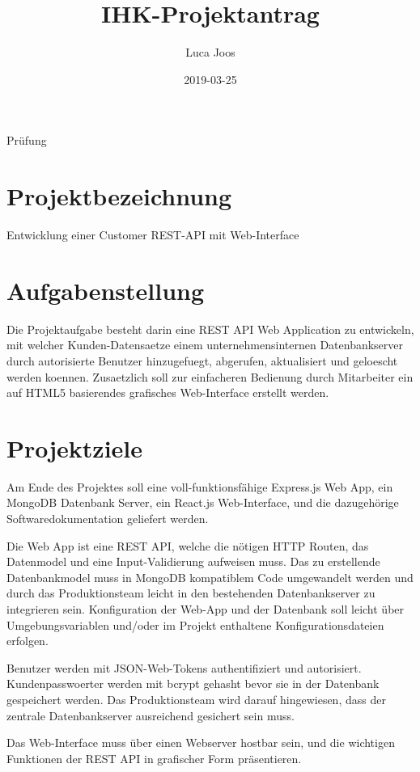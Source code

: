 \documentclass[11pt, a4paper]{article}
\title{IHK-Projektantrag}
\date{2019-03-25}
\author{Luca Joos}
\begin{document}
\maketitle
{}\newline
Pr{\"u}fung\quad {}\newline

\section{Projektbezeichnung}
Entwicklung einer Customer REST-API mit Web-Interface

\section{Aufgabenstellung}
Die Projektaufgabe besteht darin eine REST API Web Application zu entwickeln,
mit welcher Kunden-Datensaetze einem unternehmensinternen Datenbankserver durch
autorisierte Benutzer hinzugefuegt, abgerufen, aktualisiert und geloescht werden
koennen. Zusaetzlich soll zur einfacheren Bedienung durch Mitarbeiter ein auf
HTML5 basierendes grafisches Web-Interface erstellt werden.

\section{Projektziele}
Am Ende des Projektes soll eine voll-funktionsfähige Express.js Web App, ein
MongoDB Datenbank Server, ein React.js Web-Interface, und die dazugehörige
Softwaredokumentation geliefert werden.

Die Web App ist eine REST API, welche die nötigen HTTP Routen, das Datenmodel
und eine Input-Validierung aufweisen muss. Das zu erstellende Datenbankmodel
muss in MongoDB kompatiblem Code umgewandelt werden und durch das
Produktionsteam leicht in den bestehenden Datenbankserver zu integrieren sein.
Konfiguration der Web-App und der Datenbank soll leicht über Umgebungsvariablen
und/oder im Projekt enthaltene Konfigurationsdateien erfolgen.

Benutzer werden mit JSON-Web-Tokens authentifiziert und autorisiert.
Kundenpasswoerter werden mit bcrypt gehasht bevor sie in der Datenbank
gespeichert werden. Das Produktionsteam wird darauf hingewiesen, dass der
zentrale Datenbankserver ausreichend gesichert sein muss.

Das Web-Interface muss über einen Webserver hostbar sein, und die wichtigen
Funktionen der REST API in grafischer Form präsentieren.
\end{document}

